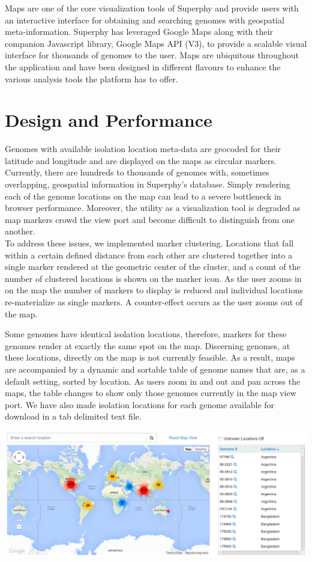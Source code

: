 \documentclass[12pt]{article}
\begin{document}
Maps are one of the core visualization tools of Superphy and provide users with an interactive interface for obtaining and searching genomes with geospatial meta-information. Superphy has leveraged Google Maps along with their companion Javascript library, Google Maps API (V3), to provide a scalable visual interface for thousands of genomes to the user. Maps are ubiquitous throughout the application and have been designed in different flavours to enhance the various analysis tools the platform has to offer.

\section{Design and Performance}

Genomes with available isolation location meta-data are geocoded for their latitude and longitude and  are displayed on the maps as circular markers. Currently, there are hundreds to thousands of genomes with, sometimes overlapping, geospatial information in Superphy's database. Simply rendering each of the genome locations on the map can lead to a severe bottleneck in browser performance. Moreover, the utility as a visualization tool is degraded as map markers crowd the view port and become difficult to distinguish from one another.\\

To address these issues, we implemented marker clustering. Locations that fall within a certain defined distance from each other are clustered together into a single marker rendered at the geometric center of the cluster, and a count of the number of clustered locations is shown on the marker icon. As the user zooms in on the map the number of markers to display is reduced and individual locations re-materialize as single markers. A counter-effect occurs as the user zooms out of the map. 

Some genomes have identical isolation locations, therefore, markers for these genomes render at exactly the same spot on the map. Discerning genomes, at these locations, directly on the map is not currently feasible. As a result, maps are accompanied by a dynamic and sortable table of genome names that are, as a default setting, sorted by location. As users zoom in and out and pan across the maps, the table changes to show only those genomes currently in the map view port. We have also made isolation locations for each genome available for download in a tab delimited text file.

\includegraphics[scale=0.35]{../manuscript_images/map.png}
\end{document}
